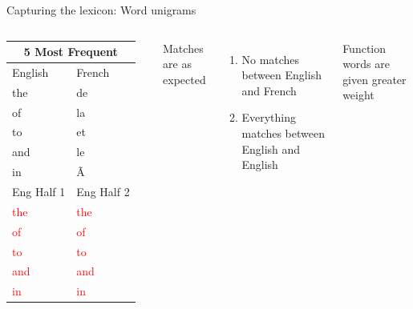 \documentclass{beamer}\usepackage[]{graphicx}\usepackage[]{color}
\newcommand{\hlight}[1]{\textcolor{red}{#1}}
\begin{document}
    \begin{frame}{Capturing the lexicon: Word unigrams}
      \begin{columns}
          \begin{tabular}{l l}
            \multicolumn{2}{c}{5 Most Frequent} \\
            \hline
            English                                  & French \\
            \hline
            the            & de \\
            of            & la \\
            to            & et \\
            and            & le \\
            in            & Ã  \\
            \hline
            Eng Half 1                               & Eng Half 2 \\
            \hline
            \hlight{the} & \hlight{the} \\
            \hlight{of} & \hlight{of} \\
            \hlight{to} & \hlight{to} \\
            \hlight{and} & \hlight{and} \\
            \hlight{in} & \hlight{in} \\
          \end{tabular}
          Matches are as expected
          \begin{enumerate}
            \item No matches between English and French
            \item Everything matches between English and English
          \end{enumerate}
          Function words are given greater weight
      \end{columns}
    \end{frame}
\end{document}
